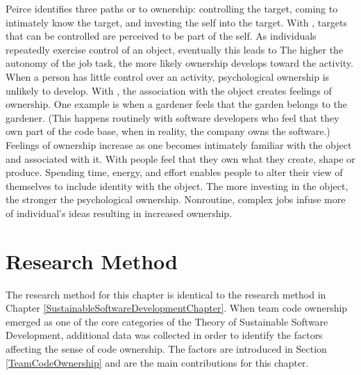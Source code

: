 Peirce identifies three paths or  to ownership: controlling the target, coming to intimately know the target, and investing the self into the target. With , targets that can be controlled are perceived to be part of the self.  As  individuals repeatedly exercise control of an object, eventually this leads to  The higher the autonomy of the job task, the more likely ownership develops toward the activity. When a person has little control over an activity, psychological ownership is unlikely to develop. With , the association with the object creates feelings of ownership. One example is when a gardener feels that the garden belongs to the gardener. (This happens routinely with software developers who feel that they own part of the code base, when in reality, the company owns the software.) Feelings of ownership increase as one becomes intimately familiar with the object and associated with it. With  people feel that they own what they create, shape or produce. Spending time, energy, and effort enables people to alter their view of themselves to include identity with the object. The more investing in the object, the stronger the psychological ownership. Nonroutine, complex jobs infuse more of individual's ideas resulting in increased ownership.

\section{Research Method}
\label{TeamCodeOwnershipResearchMethod}

The research method for this chapter is identical to the research method in Chapter \ref{SustainableSoftwareDevelopmentChapter}. When team code ownership emerged as one of the core categories of the Theory of Sustainable Software Development, additional data was collected in order to identify the factors affecting the sense of code ownership. The factors are introduced in Section \ref{TeamCodeOwnership} and are the main contributions for this chapter.  


